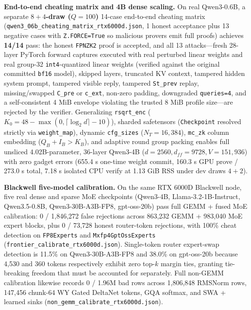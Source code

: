 \documentclass[10pt]{article}
\begin{document}
\textbf{End-to-end cheating matrix and 4B dense scaling.} On real Qwen3-0.6B, a separate \textbf{$8+4$-draw ($Q=100$)} 14-case end-to-end cheating matrix (\texttt{qwen3\_\allowbreak{}06b\_\allowbreak{}cheating\_\allowbreak{}matrix\_\allowbreak{}rtx6000d.\allowbreak{}json}, 1 honest acceptance plus 13 negative cases with \texttt{Z.\allowbreak{}FORCE=True} so malicious provers emit full proofs) achieves \textbf{14/14} pass: the honest \texttt{FPNZK2} proof is accepted, and all 13 attacks---fresh 28-layer PyTorch forward captures executed with real perturbed linear weights and real group-32 \texttt{int4}-quantized linear weights (verified against the original committed \texttt{bf16} model), skipped layers, truncated KV context, tampered hidden system prompt, tampered visible reply, tampered \texttt{St\_\allowbreak{}prev} replay, missing/swapped \texttt{C\_\allowbreak{}pre} or \texttt{c\_\allowbreak{}ext}, non-zero padding, downgraded \texttt{queries=4}, and a self-consistent 4 MiB envelope violating the trusted 8 MiB profile size---are rejected by the verifier. Generalizing \texttt{rsqrt\_\allowbreak{}enc} ($K_0 = 48 - \max(0, \lceil\log_2 d\rceil - 10)$), sharded safetensors (\texttt{Checkpoint} resolved strictly via \texttt{weight\_\allowbreak{}map}), dynamic \texttt{cfg\_\allowbreak{}sizes} ($N_T = 16{,}384$), \texttt{mc\_\allowbreak{}zk} column embedding ($Q_B + I_B > K_B$), and adaptive round group packing enables full unsliced 4.02B-parameter, 36-layer Qwen3-4B ($d=2560, d_{ff}=9728, V=151{,}936$) with zero gadget errors (655.4 s one-time weight commit, 160.3 s GPU prove / 273.0 s total, 7.18 s isolated CPU verify at 1.13 GiB RSS under dev draws $4+2$).

\textbf{Blackwell five-model calibration.} On the same RTX 6000D Blackwell node, five real dense and sparse MoE checkpoints (Qwen3-4B, Llama-3.2-1B-Instruct, Qwen3.5-0.8B, Qwen3-30B-A3B-FP8, gpt-oss-20b) pass full GEMM + fused MoE calibration: 0 / 1,846,272 false rejections across 863,232 GEMM + 983,040 MoE expert blocks, plus 0 / 73,728 honest router-token rejections, with 100\% cheat detection on \texttt{FP8Experts} and \texttt{Mxfp4GptOssExperts} (\texttt{frontier\_\allowbreak{}calibrate\_\allowbreak{}rtx6000d.\allowbreak{}json}). Single-token router expert-swap detection is 11.5\% on Qwen3-30B-A3B-FP8 and 38.0\% on gpt-oss-20b because 4,530 and 360 tokens respectively exhibit zero top-$k$ margin ties, granting tie-breaking freedom that must be accounted for separately. Full non-GEMM calibration likewise records 0 / 1.96M bad rows across 1,806,848 RMSNorm rows, 147,456 chunk-64 WY Gated DeltaNet tokens, GQA softmax, and SWA + learned sinks (\texttt{non\_\allowbreak{}gemm\_\allowbreak{}calibrate\_\allowbreak{}rtx6000d.\allowbreak{}json}).
\end{document}
